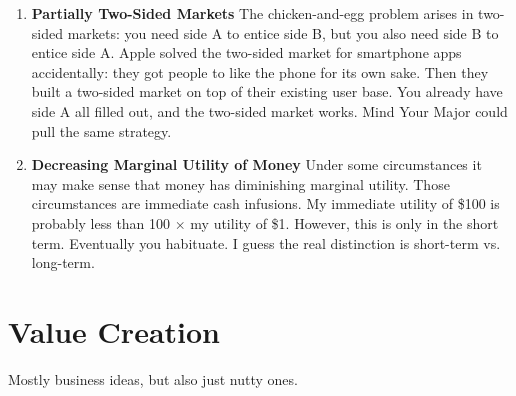 \documentclass[paper=a4, fontsize=11pt]{scrartcl} %
\numberwithin{equation}{section} %
\numberwithin{figure}{section} %
\numberwithin{table}{section} %
\begin{document}
\begin{enumerate}
\item \textbf{Partially Two-Sided Markets} The chicken-and-egg problem arises in two-sided markets: you need side A to entice side B, but you also need side B to entice side A.  Apple solved the two-sided market for smartphone apps accidentally: they got people to like the phone for its own sake.  Then they built a two-sided market on top of their existing user base.  You already have side A all filled out, and the two-sided market works.  Mind Your Major could pull the same strategy.

\item \textbf{Decreasing Marginal Utility of Money}  Under some circumstances it may make sense that money has diminishing marginal utility.  Those circumstances are immediate cash infusions.  My immediate utility of \$100 is probably less than 100 $\times$ my utility of \$1.  However, this is only in the short term.  Eventually you habituate.  I guess the real distinction is short-term vs. long-term.  

\end{enumerate}



\section{Value Creation}

Mostly business ideas, but also just nutty ones.
\end{document}
